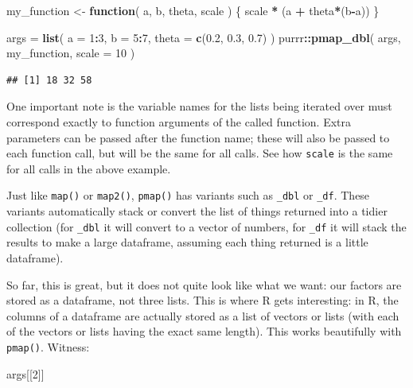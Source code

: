 \documentclass[
]{book}
\newenvironment{Shaded}{\begin{snugshade}}{\end{snugshade}}
\newcommand{\AttributeTok}[1]{\textcolor[rgb]{0.13,0.29,0.53}{#1}}
\newcommand{\ControlFlowTok}[1]{\textcolor[rgb]{0.13,0.29,0.53}{\textbf{#1}}}
\newcommand{\DecValTok}[1]{\textcolor[rgb]{0.00,0.00,0.81}{#1}}
\newcommand{\FloatTok}[1]{\textcolor[rgb]{0.00,0.00,0.81}{#1}}
\newcommand{\FunctionTok}[1]{\textcolor[rgb]{0.13,0.29,0.53}{\textbf{#1}}}
\newcommand{\NormalTok}[1]{#1}
\newcommand{\OtherTok}[1]{\textcolor[rgb]{0.56,0.35,0.01}{#1}}
\newcommand{\SpecialCharTok}[1]{\textcolor[rgb]{0.81,0.36,0.00}{\textbf{#1}}}
\begin{document}
\begin{Shaded}
\begin{Highlighting}[]
\NormalTok{my\_function }\OtherTok{\textless{}{-}} \ControlFlowTok{function}\NormalTok{( a, b, theta, scale ) \{}
\NormalTok{    scale }\SpecialCharTok{*}\NormalTok{ (a }\SpecialCharTok{+}\NormalTok{ theta}\SpecialCharTok{*}\NormalTok{(b}\SpecialCharTok{{-}}\NormalTok{a))}
\NormalTok{\}}

\NormalTok{args }\OtherTok{=} \FunctionTok{list}\NormalTok{( }\AttributeTok{a =} \DecValTok{1}\SpecialCharTok{:}\DecValTok{3}\NormalTok{, }
             \AttributeTok{b =} \DecValTok{5}\SpecialCharTok{:}\DecValTok{7}\NormalTok{, }
             \AttributeTok{theta =} \FunctionTok{c}\NormalTok{(}\FloatTok{0.2}\NormalTok{, }\FloatTok{0.3}\NormalTok{, }\FloatTok{0.7}\NormalTok{) )}
\NormalTok{purrr}\SpecialCharTok{::}\FunctionTok{pmap\_dbl}\NormalTok{(  args, my\_function, }\AttributeTok{scale =} \DecValTok{10}\NormalTok{ )}
\end{Highlighting}
\end{Shaded}

\begin{verbatim}
## [1] 18 32 58
\end{verbatim}

One important note is the variable names for the lists being iterated over must correspond exactly to function arguments of the called function.
Extra parameters can be passed after the function name; these will also be passed to each function call, but will be the same for all calls.
See how \texttt{scale} is the same for all calls in the above example.

Just like \texttt{map()} or \texttt{map2()}, \texttt{pmap()} has variants such as \texttt{\_dbl} or \texttt{\_df}.
These variants automatically stack or convert the list of things returned into a tidier collection (for \texttt{\_dbl} it will convert to a vector of numbers, for \texttt{\_df} it will stack the results to make a large dataframe, assuming each thing returned is a little dataframe).

So far, this is great, but it does not quite look like what we want: our factors are stored as a dataframe, not three lists.
This is where R gets interesting: in R, the columns of a dataframe are actually stored as a list of vectors or lists (with each of the vectors or lists having the exact same length).
This works beautifully with \texttt{pmap()}.
Witness:

\begin{Shaded}
\begin{Highlighting}[]
\NormalTok{args[[}\DecValTok{2}\NormalTok{]]}
\end{Highlighting}
\end{Shaded}
\end{document}
